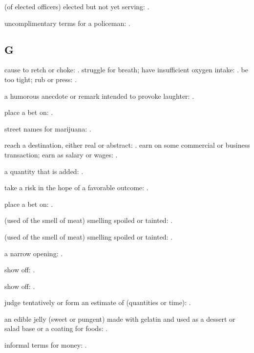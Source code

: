   (of elected officers) elected but not yet serving: .

  uncomplimentary terms for a policeman: .

\subsection*{G}

  cause to retch or choke: . struggle for breath; have insufficient oxygen intake: . be too tight; rub or press: .

  a humorous anecdote or remark intended to provoke laughter: .

  place a bet on: .

  street names for marijuana: .

  reach a destination, either real or abstract: . earn on some commercial or business transaction; earn as salary or wages: .

  a quantity that is added: .

  take a risk in the hope of a favorable outcome: .

  place a bet on: .

  (used of the smell of meat) smelling spoiled or tainted: .

  (used of the smell of meat) smelling spoiled or tainted: .

  a narrow opening: .

  show off: .

  show off: .

  judge tentatively or form an estimate of (quantities or time): .

  an edible jelly (sweet or pungent) made with gelatin and used as a dessert or salad base or a coating for foods: .

  informal terms for money: .

